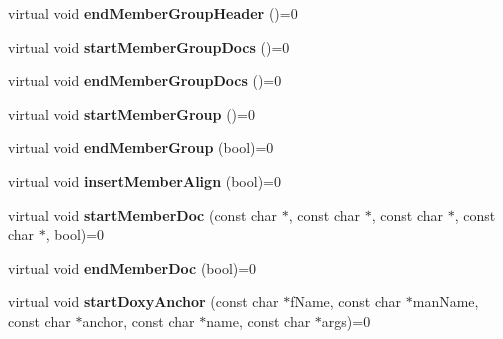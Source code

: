 \begin{DoxyCompactItemize}
\item 
\hypertarget{class_output_generator_aa924743645737b06c487c1672fd7e80e}{virtual void {\bfseries end\-Member\-Group\-Header} ()=0}\label{class_output_generator_aa924743645737b06c487c1672fd7e80e}

\item 
\hypertarget{class_output_generator_a6b85576be8bd705e5785e3135c38693b}{virtual void {\bfseries start\-Member\-Group\-Docs} ()=0}\label{class_output_generator_a6b85576be8bd705e5785e3135c38693b}

\item 
\hypertarget{class_output_generator_a838e36848183bc08fe517338514df666}{virtual void {\bfseries end\-Member\-Group\-Docs} ()=0}\label{class_output_generator_a838e36848183bc08fe517338514df666}

\item 
\hypertarget{class_output_generator_a05262f1f36ce8e6b8c96aceef43ef517}{virtual void {\bfseries start\-Member\-Group} ()=0}\label{class_output_generator_a05262f1f36ce8e6b8c96aceef43ef517}

\item 
\hypertarget{class_output_generator_aad65f94cf70ed1c4f3256bf69d9b3b2c}{virtual void {\bfseries end\-Member\-Group} (bool)=0}\label{class_output_generator_aad65f94cf70ed1c4f3256bf69d9b3b2c}

\item 
\hypertarget{class_output_generator_a344e6e0d7c41ab6908c4851d6ad53a58}{virtual void {\bfseries insert\-Member\-Align} (bool)=0}\label{class_output_generator_a344e6e0d7c41ab6908c4851d6ad53a58}

\item 
\hypertarget{class_output_generator_ac97537be0bb34779be50da00d3466fb6}{virtual void {\bfseries start\-Member\-Doc} (const char $\ast$, const char $\ast$, const char $\ast$, const char $\ast$, bool)=0}\label{class_output_generator_ac97537be0bb34779be50da00d3466fb6}

\item 
\hypertarget{class_output_generator_a7d6e3a0baf7d81c339e55046e0d72a5b}{virtual void {\bfseries end\-Member\-Doc} (bool)=0}\label{class_output_generator_a7d6e3a0baf7d81c339e55046e0d72a5b}

\item 
\hypertarget{class_output_generator_af8073ae51ea25299c2bee922a66b7472}{virtual void {\bfseries start\-Doxy\-Anchor} (const char $\ast$f\-Name, const char $\ast$man\-Name, const char $\ast$anchor, const char $\ast$name, const char $\ast$args)=0}\label{class_output_generator_af8073ae51ea25299c2bee922a66b7472}


\end{DoxyCompactItemize}

